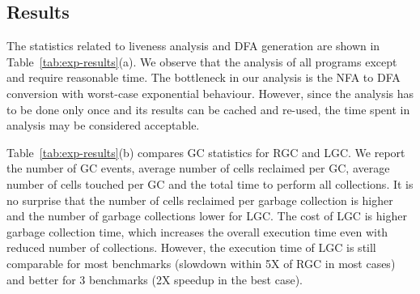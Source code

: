 \documentclass[9pt,nonatbib]{sigplanconf}
\begin{document}




\subsection{Results}

The statistics  related to  liveness analysis  and DFA  generation are
shown in Table~\ref{tab:exp-results}(a). We  observe that the analysis
of  all  programs  except \verb@treejoin@  and  \verb@sudoku@  require
reasonable time.   The bottleneck in  our analysis  is the NFA  to DFA
conversion with  worst-case exponential behaviour. However,  since the
analysis has  to be  done only  once and its  results can be cached and
re-used, the time spent in analysis may be considered acceptable.


Table~\ref{tab:exp-results}(b) compares  GC statistics
for RGC and  LGC.  We report the number of  GC events,
average  number of  cells  reclaimed per  GC,  average
number of cells  touched per GC and the  total time to
perform all collections.   It is no surprise that the  number of cells
reclaimed per garbage  collection is higher and the  number of garbage
collections  lower  for  LGC.   The  cost of  LGC  is  higher  garbage
collection time, which increases the  overall execution time even with
reduced number of  collections.  However, the execution time  of LGC is
still comparable for most benchmarks (slowdown within 5X of
RGC in most cases) and better  for 3 benchmarks (2X speedup in the
best case).  
\end{document}
